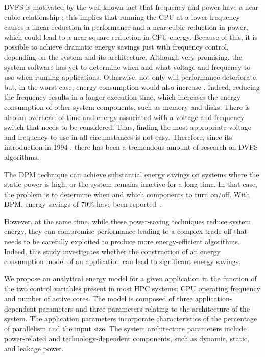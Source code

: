 DVFS is motivated by the well-known fact that frequency and power have a near-cubic relationship \cite{Dayarathna2016DataSurvey, Group2012HandbookSahni}; this implies that running the CPU at a lower frequency causes a linear reduction in performance and a near-cubic reduction in power, which could lead to a near-square reduction in CPU energy.
Because of this, it is possible to achieve dramatic energy savings just with frequency control, depending on the system and its architecture.
Although very promising, the system software has yet to determine when and what voltage and frequency to use when running applications.
Otherwise, not only will performance deteriorate, but, in the worst case, energy consumption would also increase  \cite{Group2012HandbookSahni}.
Indeed, reducing the frequency results in a longer execution time, which increases the energy consumption of other system components, such as memory and disks.
There is also an overhead of time and energy associated with a voltage and frequency switch that needs to be considered.
Thus, finding the most appropriate voltage and frequency to use in all circumstances is not easy.
Therefore, since its introduction in 1994 \cite{Group2012HandbookSahni}, there has been a tremendous amount of research on DVFS algorithms.

The DPM technique can achieve substantial energy savings on systems where the static power is high, or the system remains inactive for a long time.
In that case, the problem is to determine when and which components to turn on/off.
With DPM, energy savings of 70\% have been reported~\cite{Shuja2012Energy-efficientCenters, Benini2000AManagement}. 

However, at the same time, while these power-saving techniques reduce system energy, they can compromise  performance leading  to a complex trade-off that needs to be carefully exploited to produce more energy-efficient algorithms.
Indeed, this study investigates whether the construction of an energy consumption model of an application can lead to significant energy savings.

We propose an analytical energy model for a given application in the function of the two control variables present in most HPC systems: CPU operating frequency and number of active cores. The model is composed of three application-dependent parameters and three parameters relating to the architecture of the system. The application parameters incorporate characteristics of the percentage of parallelism and the input size. The system architecture parameters include power-related and technology-dependent components, such as dynamic, static, and leakage power.

